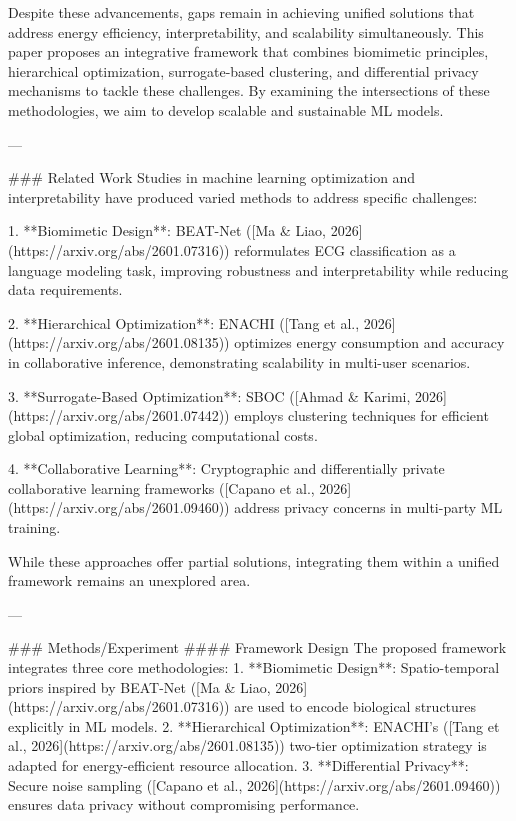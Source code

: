 Despite these advancements, gaps remain in achieving unified solutions that address energy efficiency, interpretability, and scalability simultaneously. This paper proposes an integrative framework that combines biomimetic principles, hierarchical optimization, surrogate-based clustering, and differential privacy mechanisms to tackle these challenges. By examining the intersections of these methodologies, we aim to develop scalable and sustainable ML models.

---

### Related Work  
Studies in machine learning optimization and interpretability have produced varied methods to address specific challenges:

1. **Biomimetic Design**: BEAT-Net ([Ma & Liao, 2026](https://arxiv.org/abs/2601.07316)) reformulates ECG classification as a language modeling task, improving robustness and interpretability while reducing data requirements.
   
2. **Hierarchical Optimization**: ENACHI ([Tang et al., 2026](https://arxiv.org/abs/2601.08135)) optimizes energy consumption and accuracy in collaborative inference, demonstrating scalability in multi-user scenarios.
   
3. **Surrogate-Based Optimization**: SBOC ([Ahmad & Karimi, 2026](https://arxiv.org/abs/2601.07442)) employs clustering techniques for efficient global optimization, reducing computational costs.
   
4. **Collaborative Learning**: Cryptographic and differentially private collaborative learning frameworks ([Capano et al., 2026](https://arxiv.org/abs/2601.09460)) address privacy concerns in multi-party ML training.

While these approaches offer partial solutions, integrating them within a unified framework remains an unexplored area.

---

### Methods/Experiment  
#### Framework Design  
The proposed framework integrates three core methodologies:
1. **Biomimetic Design**: Spatio-temporal priors inspired by BEAT-Net ([Ma & Liao, 2026](https://arxiv.org/abs/2601.07316)) are used to encode biological structures explicitly in ML models.
2. **Hierarchical Optimization**: ENACHI's ([Tang et al., 2026](https://arxiv.org/abs/2601.08135)) two-tier optimization strategy is adapted for energy-efficient resource allocation.
3. **Differential Privacy**: Secure noise sampling ([Capano et al., 2026](https://arxiv.org/abs/2601.09460)) ensures data privacy without compromising performance.

